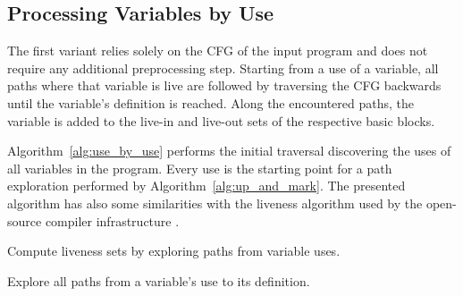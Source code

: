 \subsection{Processing Variables by Use}
\label{sec:llvm-like}

The first variant relies solely on the CFG of the input program and does not require any additional preprocessing step.
Starting from a use of a variable, all paths where that variable is live are followed by traversing the CFG backwards until the variable's definition is reached.
Along the encountered paths, the variable is added to the live-in and live-out sets of the respective basic blocks.

Algorithm~\ref{alg:use_by_use} performs the initial traversal discovering the uses of all variables in the program.
Every use is the starting point for a path exploration performed by Algorithm~\ref{alg:up_and_mark}.
The presented algorithm has also some similarities with the liveness algorithm used by the open-source compiler infrastructure \@LLVM.

 \begin{algorithm}[H]
   \caption{Compute liveness sets by exploring paths from variable uses.}
   \label{alg:use_by_use}
 \end{algorithm}

\begin{algorithm}[H]
  \caption{Explore all paths from a variable's use to its definition.}
  \label{alg:up_and_mark}
\end{algorithm}

